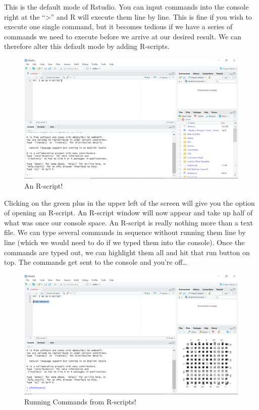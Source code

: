 \documentclass[
]{book}
\begin{document}
This is the default mode of Rstudio. You can input commands into the console right at the ``\textgreater{}'' and R will execute them line by line. This is fine if you wish to execute one single command, but it becomes tedious if we have a series of commands we need to execute before we arrive at our desired result. We can therefore alter this default mode by adding R-scripts.

\begin{figure}

{\centering \includegraphics[width=0.75\linewidth]{images/Screenshot2} 

}

\caption{An R-script!}\label{fig:unnamed-chunk-30}
\end{figure}

Clicking on the green plus in the upper left of the screen will give you the option of opening an R-script. An R-script window will now appear and take up half of what was once our console space. An R-script is really nothing more than a text file. We can type several commands in sequence without running them line by line (which we would need to do if we typed them into the console). Once the commands are typed out, we can highlight them all and hit that run button on top. The commands get sent to the console and you're off\ldots{}

\begin{figure}

{\centering \includegraphics[width=0.75\linewidth]{images/Screenshot3} 

}

\caption{Running Commands from R-scripts!}\label{fig:unnamed-chunk-31}
\end{figure}
\end{document}
